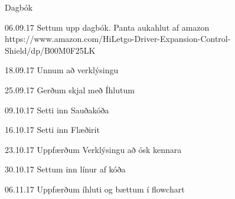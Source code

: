 Dagbók

06.09.17
Settum upp dagbók. Panta aukahlut af amazon https://www.amazon.com/HiLetgo-Driver-Expansion-Control-Shield/dp/B00M0F25LK

18.09.17
Unnum að verklýsingu

25.09.17
Gerðum skjal með Íhlutum

09.10.17
Setti inn Sauðakóða

16.10.17
Setti inn Flæðirit

23.10.17
Uppfærðum Verklýsingu að ósk kennara

30.10.17
Settum inn línur af kóða

06.11.17
Uppfærðum íhluti og bættum í flowchart